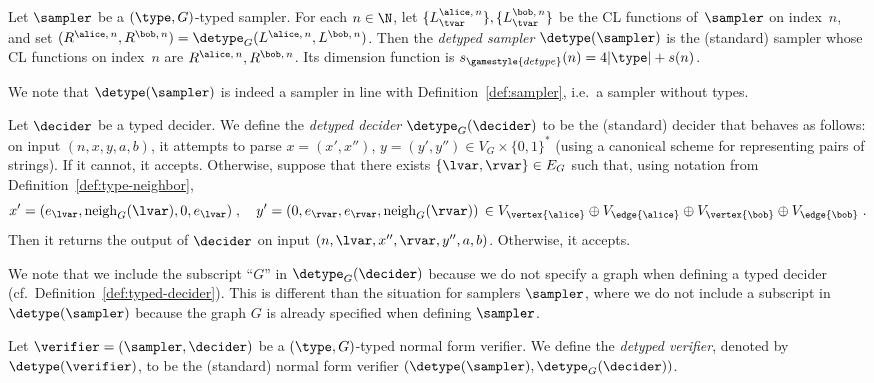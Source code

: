 \begin{definition}
  Let $\sampler$ be a $(\type,G)$-typed sampler.
  For each $n \in \N$, let $\{L^{\alice,\, n}_\tvar\}, \{L^{\bob,\, n}_\tvar\}$
  be the CL functions of~$\sampler$ on index~$n$, and set
  $(R^{\alice,\, n}, R^{\bob,\, n}) = \detype_G(L^{\alice,\, n}, L^{\bob,\,
    n})$.
  Then the \emph{detyped sampler} $\detype(\sampler)$ is the (standard)
  sampler whose CL functions on index~$n$ are $R^{\alice,\, n}, R^{\bob,\, n}$.
  Its dimension function is $s_{\gamestyle{detype}}(n) = 4|\type|+s(n)$.
\end{definition}

We note that $\detype(\sampler)$ is indeed a sampler in line with Definition~\ref{def:sampler},
i.e.\ a sampler without types.

\begin{definition}
  Let $\decider$ be a typed decider.
  We define the \emph{detyped decider} $\detype_G(\decider)$ to be the
  (standard) decider that behaves as follows: on input $(n,x,y,a,b)$, it
  attempts to parse $x = (x', x'')$, $y =(y', y'') \in V_G \times \{0,1\}^*$
  (using a canonical scheme for representing pairs of strings).
  If it cannot, it accepts.
  Otherwise, suppose that there exists $\{\lvar, \rvar\} \in E_G$ such that,
  using notation from Definition~\ref{def:type-neighbor},
  \begin{equation*}
    x' = (e_\lvar, \mathrm{neigh}_G(\lvar), 0, e_\lvar)\;,\quad
    y' = (0, e_\rvar, e_\rvar, \mathrm{neigh}_G(\rvar))
    \, \in V_{\vertex{\alice}} \oplus V_{\edge{\alice}}
    \oplus V_{\vertex{\bob}} \oplus V_{\edge{\bob}}\;.
  \end{equation*}
  Then it returns the output of $\decider$ on input $(n, \lvar, x'', \rvar, y'',
  a, b)$.
  Otherwise, it accepts.
\end{definition}

We note that we include the subscript ``$G$'' in $\detype_G(\decider)$
because we do not specify a graph when defining a typed decider (cf.\ Definition~\ref{def:typed-decider}).
This is different than the situation for samplers $\sampler$,
where we do not include a subscript in $\detype(\sampler)$
because the graph $G$ is already specified when defining $\sampler$.

\begin{definition}
\label{def:detyped-verifier}
  Let $\verifier = (\sampler, \decider)$ be a $(\type, G)$-typed normal form
  verifier.
  We define the \emph{detyped verifier}, denoted by $\detype(\verifier)$, to be
  the (standard) normal form verifier
  $(\detype(\sampler), \detype_G(\decider))$.
\end{definition}

